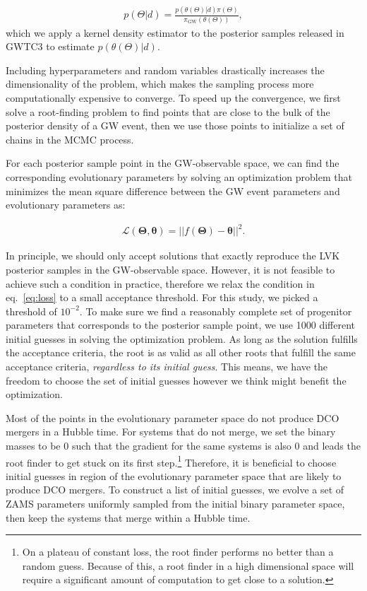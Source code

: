 \documentclass[twocolumn]{aastex631}
\begin{document}
\begin{align}
    p(\Theta | d) = \frac{p(\theta(\Theta)| d) \pi(\Theta)}{\pi_\mathrm{GW}(\theta(\Theta))},
\end{align}
which we apply a kernel density estimator to the posterior samples released in GWTC3 to estimate $p(\theta(\Theta)|d)$.

Including hyperparameters and random variables %
drastically increases the dimensionality of the problem,
which makes the sampling process more computationally expensive to converge.
To speed up the convergence, we first solve a root-finding problem to find points that are close to the bulk of the posterior density of a GW event,
then we use those points to initialize a set of chains in the MCMC process.

For each posterior sample point in the GW-observable space,
we can find the corresponding evolutionary parameters by solving an optimization problem that minimizes 
the mean square difference between the GW event parameters and evolutionary parameters as:

\begin{align}
\mathcal{L}(\bm{\Theta},\bm{\theta}) = ||f(\bm{\Theta})-\bm{\theta}||^2.
\label{eq:loss}
\end{align}

In principle, we should only accept solutions that exactly reproduce the LVK posterior samples in the GW-observable space.
However, it is not feasible to achieve such a condition in practice, therefore we relax the condition in eq.~\ref{eq:loss} 
to a small acceptance threshold. For this study, we picked a threshold of $10^{-2}$. To make sure we find a reasonably 
complete set of progenitor parameters that corresponds to the posterior sample point, we use 1000 different initial guesses 
in solving the optimization problem. As long as the solution fulfills the acceptance criteria, the root is as valid as all 
other roots that fulfill the same acceptance criteria, \emph{regardless to its initial guess}.
This means, we have the freedom to choose the set of initial guesses however we think might benefit the optimization.

Most of the points in the evolutionary parameter space do not produce DCO mergers in a Hubble time. For systems that do not merge, 
we set the binary masses to be $0$ such that the gradient for the same systems is also $0$ and leads the root finder to get stuck on 
its first step.{\footnote{On a plateau of constant loss, the root finder performs no better than a random guess. 
Because of this, a root finder in a high dimensional space will require a significant amount of computation
to get close to a solution.}} Therefore, it is beneficial to choose initial guesses in region of the evolutionary parameter 
space that are likely to produce DCO mergers. To construct a list of initial guesses, we evolve a set of 
ZAMS parameters uniformly sampled from the initial binary parameter space, then keep the systems that 
merge within a Hubble time.
\end{document}
